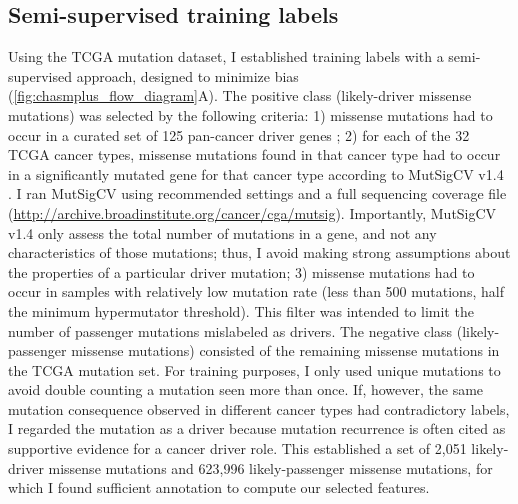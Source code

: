 \subsection{Semi-supervised training labels}
Using the TCGA mutation dataset, I established training labels with a semi-supervised approach, designed to minimize bias (\autoref{fig:chasmplus_flow_diagram}A). The positive class (likely-driver missense mutations) was selected by the following criteria: 1) missense mutations had to occur in a curated set of 125 pan-cancer driver genes \cite{RN25}; 2) for each of the 32 TCGA cancer types, missense mutations found in that cancer type had to occur in a significantly mutated gene for that cancer type according to MutSigCV v1.4 \cite{RN14}. I ran MutSigCV using recommended settings and a full sequencing coverage file (\url{http://archive.broadinstitute.org/cancer/cga/mutsig}).  Importantly, MutSigCV v1.4 only assess the total number of mutations in a gene, and not any characteristics of those mutations; thus, I avoid making strong assumptions about the properties of a particular driver mutation; 3) missense mutations had to occur in samples with relatively low mutation rate (less than 500 mutations, half the minimum hypermutator threshold).  This filter was intended to limit the number of passenger mutations mislabeled as drivers.  The negative class (likely-passenger missense mutations) consisted of the remaining missense mutations in the TCGA mutation set.  For training purposes, I only used unique mutations to avoid double counting a mutation seen more than once. If, however, the same mutation consequence observed in different cancer types had contradictory labels, I regarded the mutation as a driver because mutation recurrence is often cited as supportive evidence for a cancer driver role. This established a set of 2,051 likely-driver missense mutations and 623,996 likely-passenger missense mutations, for which I found sufficient annotation to compute our selected features.

